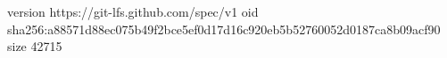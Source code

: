 version https://git-lfs.github.com/spec/v1
oid sha256:a88571d88ec075b49f2bce5ef0d17d16c920eb5b52760052d0187ca8b09acf90
size 42715
